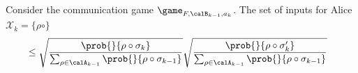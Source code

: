 \newcommand{\calX}{\mathcal{X}} 

    Consider the communication game $\game_{F,\calB_{k-1},a_k}$.
    The set of inputs for Alice $\calX_k = \{\rho \circ \}$
    \begin{align*}
        &\leq \sqrt{\frac{\prob{}{\rho\circ \sigma_k}}{\sum_{\rho \in \calA_{k-1}}\prob{}{\rho\circ \sigma_{k-1}}}} \sqrt{\frac{\prob{}{\rho\circ \sigma_k'}}{\sum_{\rho \in \calA_{k-1}}\prob{}{\rho\circ \sigma_{k-1}}}}
    \end{align*}

    

    
    




     

    
    
